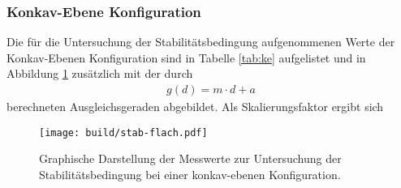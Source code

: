 \subsubsection{Konkav-Ebene Konfiguration}
Die für die Untersuchung der Stabilitätsbedingung aufgenommenen Werte der
Konkav-Ebenen Konfiguration sind in Tabelle \ref{tab:ke} aufgelistet und
in Abbildung \ref{plt:ke} zusätzlich mit der durch
\begin{align*}
  g(d) = m\cdot d + a
\end{align*}
berechneten Ausgleichsgeraden abgebildet. Als Skalierungsfaktor ergibt
sich %
\begin{figure}[htb]
  \centering
  \texttt{[image: build/stab-flach.pdf]}
  \caption{Graphische Darstellung der Messwerte zur Untersuchung der Stabilitätsbedingung bei einer konkav-ebenen Konfiguration.}
  \label{plt:ke}
\end{figure}

%
